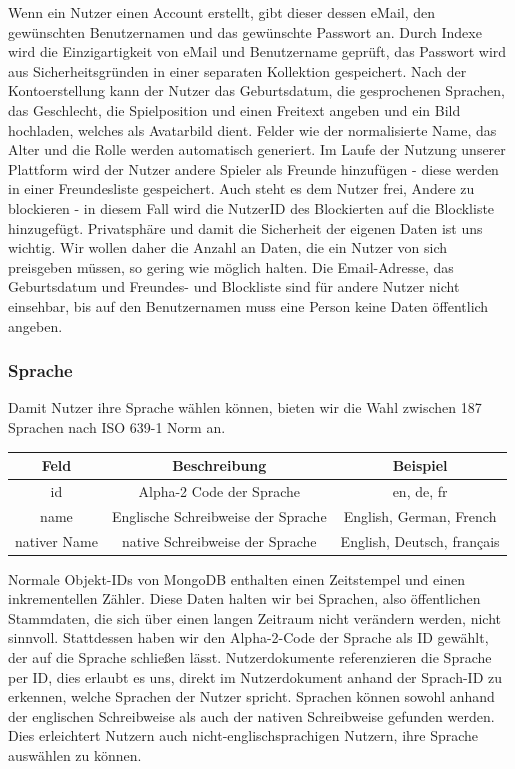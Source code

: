 Wenn ein Nutzer einen Account erstellt, gibt dieser dessen eMail, den gewünschten Benutzernamen und das gewünschte Passwort an. Durch Indexe wird die Einzigartigkeit von eMail und Benutzername geprüft, das Passwort wird aus Sicherheitsgründen in einer separaten Kollektion gespeichert. Nach der Kontoerstellung kann der Nutzer das Geburtsdatum, die gesprochenen Sprachen, das Geschlecht, die Spielposition und einen Freitext angeben und ein Bild hochladen, welches als Avatarbild dient. Felder wie der normalisierte Name, das Alter und die Rolle werden automatisch generiert. Im Laufe der Nutzung unserer Plattform wird der Nutzer andere Spieler als Freunde hinzufügen - diese werden in einer Freundesliste gespeichert. Auch steht es dem Nutzer frei, Andere zu blockieren - in diesem Fall wird die NutzerID des Blockierten auf die Blockliste hinzugefügt.
Privatsphäre und damit die Sicherheit der eigenen Daten ist uns wichtig. Wir wollen daher die Anzahl an Daten, die ein Nutzer von sich preisgeben müssen, so gering wie möglich halten. Die Email-Adresse, das Geburtsdatum und Freundes- und Blockliste sind für andere Nutzer nicht einsehbar, bis auf den Benutzernamen muss eine Person keine Daten öffentlich angeben.

\subsubsection{Sprache}
Damit Nutzer ihre Sprache wählen können, bieten wir die Wahl zwischen 187 Sprachen nach ISO 639-1 Norm an.\cite{ISO639-1} 

\begin{center}
    \begin{tabular}{ |c|c|c| }
        \hline
        Feld & Beschreibung & Beispiel \\
        \hline
        id & Alpha-2 Code der Sprache & en, de, fr \\
        name & Englische Schreibweise der Sprache & English, German, French \\
        nativer Name & native Schreibweise der Sprache & English, Deutsch, français \\
        \hline
    \end{tabular}
\end{center}
Normale Objekt-IDs von MongoDB enthalten einen Zeitstempel und einen inkrementellen Zähler.\cite{MG15} Diese Daten halten wir bei Sprachen, also öffentlichen Stammdaten, die sich über einen langen Zeitraum nicht verändern werden, nicht sinnvoll. Stattdessen haben wir den Alpha-2-Code der Sprache als ID gewählt, der auf die Sprache schließen lässt. Nutzerdokumente referenzieren die Sprache per ID, dies erlaubt es uns, direkt im Nutzerdokument anhand der Sprach-ID zu erkennen, welche Sprachen der Nutzer spricht.
Sprachen können sowohl anhand der englischen Schreibweise als auch der nativen Schreibweise gefunden werden. Dies erleichtert Nutzern auch nicht-englischsprachigen Nutzern, ihre Sprache auswählen zu können.

